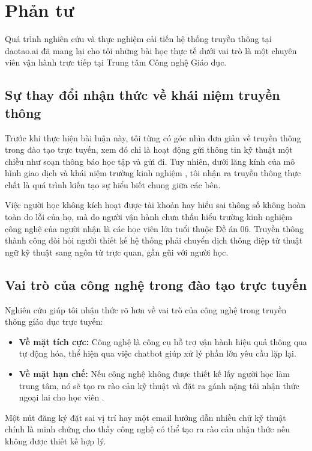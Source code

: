 \section{Phản tư}

Quá trình nghiên cứu và thực nghiệm cải tiến hệ thống truyền thông tại daotao.ai đã mang lại cho tôi những bài học thực tế dưới vai trò là một chuyên viên vận hành trực tiếp tại Trung tâm Công nghệ Giáo dục.

\subsection{Sự thay đổi nhận thức về khái niệm truyền thông}

Trước khi thực hiện bài luận này, tôi từng có góc nhìn đơn giản về truyền thông trong đào tạo trực tuyến, xem đó chỉ là hoạt động gửi thông tin kỹ thuật một chiều như soạn thông báo học tập và gửi đi. Tuy nhiên, dưới lăng kính của mô hình giao dịch \parencite{barnlund2008} và khái niệm trường kinh nghiệm \parencite{schramm1954}, tôi nhận ra truyền thông thực chất là quá trình kiến tạo sự hiểu biết chung giữa các bên.

Việc người học không kích hoạt được tài khoản hay hiểu sai thông số không hoàn toàn do lỗi của họ, mà do người vận hành chưa thấu hiểu trường kinh nghiệm công nghệ của người nhận là các học viên lớn tuổi thuộc Đề án 06. Truyền thông thành công đòi hỏi người thiết kế hệ thống phải chuyển dịch thông điệp từ thuật ngữ kỹ thuật sang ngôn từ trực quan, gần gũi với người học.

\subsection{Vai trò của công nghệ trong đào tạo trực tuyến}

Nghiên cứu giúp tôi nhận thức rõ hơn về vai trò của công nghệ trong truyền thông giáo dục trực tuyến:
\begin{itemize}
    \item \textbf{Về mặt tích cực:} Công nghệ là công cụ hỗ trợ vận hành hiệu quả thông qua tự động hóa, thể hiện qua việc chatbot giúp xử lý phần lớn yêu cầu lặp lại.
    \item \textbf{Về mặt hạn chế:} Nếu công nghệ không được thiết kế lấy người học làm trung tâm, nó sẽ tạo ra rào cản kỹ thuật và đặt ra gánh nặng tải nhận thức ngoại lai cho học viên \parencite{sweller1988}.
\end{itemize}

Một nút đăng ký đặt sai vị trí hay một email hướng dẫn nhiều chữ kỹ thuật chính là minh chứng cho thấy công nghệ có thể tạo ra rào cản nhận thức nếu không được thiết kế hợp lý.

